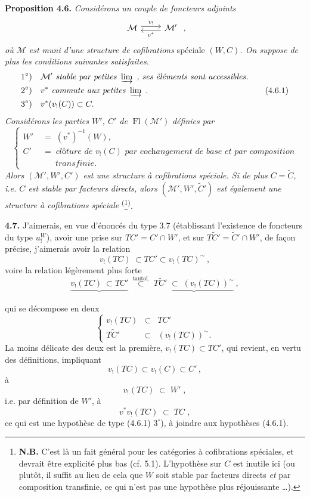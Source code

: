 \documentclass[11pt]{article}
\newcommand{\printedpage}[1]{\marginpar{\footnotesize p.~#1}}
\newcommand{\msp}[1]{\marginpar{\footnotesize [#1]}}
\newcommand{\Fl}{\operatorname{Fl}}
\newcommand{\postilde}{^{\sim}}
\newcommand{\cl}{^{\sim}}%
\begin{document}
\textbf{Proposition 4.6.} \textit{Considérons un couple de foncteurs adjoints}
\[
\begin{tikzcd}
\mathcal{M} \arrow[r, shift left, "v_!"] & \mathcal{M}' \arrow[l, shift left, "v^*"]
\end{tikzcd}
\ ,
\]
\textit{où $\mathcal{M}$ est muni d'une structure de cofibrations} spéciale $(W, C)$\textit{. On suppose de plus les conditions suivantes satisfaites.}
\[
\begin{aligned}
&1^\circ)\quad \mathcal{M}' \textit{ stable par petites } \varinjlim\ \textit{, ses éléments sont accessibles.} \\
&2^\circ)\quad v^* \textit{ commute aux petites } \varinjlim\ . \\
&3^\circ)\quad v^*(v_!(C)) \subset C.
\end{aligned} \tag*{(4.6.1)}
\]
\msp{page 79}
\textit{Considérons les parties $W'$, $C'$ de} $\Fl(\mathcal{M}')$ \textit{définies par}
\[
\left\{
\begin{aligned}
W' \;&=\; (v^*)^{-1}(W), \\
C' \;&=\; \textit{clôture de } v_!(C) \textit{ par cochangement de base et par composition} \\
&\phantom{\;=\;}\ \textit{transfinie.}
\end{aligned}
\right. \tag*{(4.6.2)}
\]
\textit{Alors $(\mathcal{M}', W', C')$ est une structure à cofibrations spéciale. Si de plus $C = \tilde{C}$, i.e. $C$ est stable par facteurs directs, alors $(\mathcal{M}', W', \tilde{C}')$ est également une structure à cofibrations spéciale} \textsuperscript{(}\footnote[20]{\textbf{N.B.} C'est là un fait général pour les catégories à cofibrations spéciales, et devrait être explicité plus bas (cf. 5.1). L'hypothèse sur $C$ est inutile ici (ou plutôt, il suffit au lieu de cela que $W$ soit stable par facteurs directs \textit{et} par composition transfinie, ce qui n'est pas une hypothèse plus réjouissante \dots).}\textsuperscript{)}.

\textbf{4.7.} J'aimerais, en vue d'énoncés du type 3.7 (établissant l'existence de foncteurs du type $u_!^W$), avoir une prise sur $TC' = C'{\cap}W'$, et sur $T\tilde{C}' = \tilde{C}'{\cap}W'$, de façon précise, j'aimerais avoir la relation
\[
v_!(TC)\ \subset TC' \subset v_!(TC)\postilde\ , \tag*{(4.7.1)}
\]
voire la relation légèrement plus forte
\[
\underbrace{v_!(TC)\ \subset TC'}_{} \ \overset{\text{tautol.}}{\subset}\ \underbrace{T\tilde{C}' \;\subset\; (v_!(TC))\postilde}_{}\ , \tag*{(4.7.2)}
\]

\printedpage{39}
qui se décompose en deux
\[
\left\{
\begin{array}{rcl}
v_{!}(TC) & \subset & TC' \\
T\tilde{C}' & \subset & (v_{!}(TC))\cl.
\end{array}
\right.
\tag*{(4.7.3)}
\]
La moins délicate des deux est la \msp{page 80} première, $v_{!}(TC) \subset TC'$, qui revient, en vertu des définitions, impliquant
\[
v_{!}(TC) \subset v_{!}(C) \subset C' \, ,
\]
à
\[
v_{!}(TC) \;\subset\; W' \; ,
\]
i.e. par définition de $W'$, à
\[
v^{*}v_{!}(TC) \;\subset\; TC \; ,
\tag*{(4.7.4)}
\]
ce qui est une hypothèse de type (4.6.1) $3^{\circ}$), à joindre aux hypothèses (4.6.1).
\end{document}
